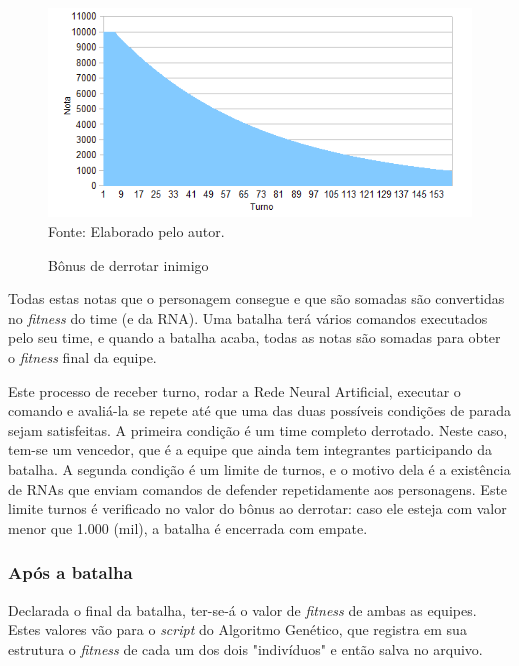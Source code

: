 \documentclass[12pt,a4paper]{article}
\newcommand{\source}[1]{\small Fonte: {#1}}
\begin{document}
	\begin{figure}[ht!]
		\centering
		\caption{Bônus de derrotar inimigo}
		\includegraphics[scale=0.8]{DefeatBonusGraph.png}\\
		\vspace{0.5mm}
		\source{Elaborado pelo autor.}
		\label{fig:defeatBonusGraph}
	\end{figure}
	
	Todas estas notas que o personagem consegue e que são somadas são convertidas no \textit{fitness} do time (e da RNA).
	Uma batalha terá vários comandos executados pelo seu time,
	e quando a batalha acaba,
	todas as notas são somadas para obter o \textit{fitness} final da equipe.
	
	Este processo de receber turno,
	rodar a Rede Neural Artificial,
	executar o comando e avaliá-la
	se repete até que uma das duas possíveis condições de parada sejam satisfeitas.
	A primeira condição é um time completo derrotado.
	Neste caso, tem-se um vencedor, que é a equipe que ainda tem integrantes participando da batalha.
	A segunda condição é um limite de turnos,
	e o motivo dela é a existência de RNAs que enviam comandos de defender repetidamente aos personagens.
	Este limite turnos é verificado no valor do bônus ao derrotar:
	caso ele esteja com valor menor que 1.000 (mil),
	a batalha é encerrada com empate.
	
	\subsubsection{Após a batalha}
	Declarada o final da batalha,
	ter-se-á o valor de \textit{fitness} de ambas as equipes.
	Estes valores vão para o \textit{script} do Algoritmo Genético,
	que registra em sua estrutura o \textit{fitness} de cada um dos dois "indivíduos"{} e então salva no arquivo.
	
\end{document}
